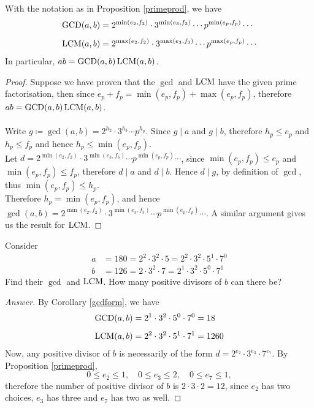 \vspace*{1em}

\begin{lemma}\label{gcdform}
With the notation as in Proposition \ref{primeprod}, we have
\begin{align*}
\operatorname{GCD}(a,b) &= 2^{\min(e_2,f_2)}\cdot 3^{\min(e_3,f_3)}\cdots p^{\min(e_p,f_p)}\cdots\\[0.5em]
\operatorname{LCM}(a,b) &= 2^{\max(e_2,f_2)}\cdot 3^{\max(e_3,f_3)}\cdots p^{\max(e_p,f_p)}\cdots
\end{align*}
In particular, $ab = \operatorname{GCD}(a,b)\operatorname{LCM}(a,b)$.
\end{lemma}
\begin{proof}
Suppose we have proven that the $\gcd$ and $\operatorname{LCM}$ have the given prime factorisation, then since $e_p + f_p = \min(e_p,f_p) + \max(e_p,f_p)$, therefore $ab = \operatorname{GCD}(a,b)\operatorname{LCM}(a,b)$.\\
\\
Write $g \coloneqq \gcd(a,b) = 2^{h_2}\cdot 3^{h_3}\cdots p^{h_p}$. Since $g\mid a$ and $g\mid b$, therefore $h_p \leq e_p$ and $h_p \leq f_p$ and hence $h_p \leq \min(e_p,f_p)$.\\[0.5em]
Let $d = 2^{\min(e_2,f_2)}\cdot 3^{\min(e_3,f_3)}\cdots p^{\min(e_p,f_p)}\cdots$, since $\min(e_p,f_p) \leq e_p$ and $\min(e_p,f_p) \leq f_p$, therefore $d\mid a$ and $d\mid b$. Hence $d\mid g$, by definition of $\gcd$, thus $\min(e_p,f_p) \leq h_p$.\\[0.5em]
Therefore $h_p = \min(e_p,f_p)$, and hence $\gcd(a,b) = 2^{\min(e_2,f_2)}\cdot 3^{\min(e_3,f_3)}\cdots p^{\min(e_p,f_p)}\cdots$. A similar argument gives us the result for $\operatorname{LCM}$.
\end{proof}

\vspace*{1em}

\begin{example}
Consider
\begin{align*}
a &= 180 = 2^2\cdot 3^2\cdot 5 = 2^2\cdot 3^2\cdot 5^1\cdot 7^0\\[0.5em]
b &= 126 = 2\cdot 3^2\cdot 7 = 2^1\cdot 3^2\cdot 5^0\cdot 7^1
\end{align*}
Find their $\gcd$ and $\operatorname{LCM}$. How many positive divisors of $b$ can there be?
\end{example}
\begin{proof}[Answer]
By Corollary \ref{gcdform}, we have
\begin{align*}
\operatorname{GCD}(a,b) &= 2^1\cdot 3^2\cdot 5^0\cdot 7^0 = 18\\[0.5em]
\operatorname{LCM}(a,b) &= 2^2\cdot 3^2\cdot 5^1\cdot 7^1 = 1260
\end{align*}
Now, any positive divisor of $b$ is necessarily of the form $d = 2^{e_2}\cdot 3^{e_3}\cdot 7^{e_7}$. By Proposition \ref{primeprod}, 
\[0 \leq e_2 \leq 1,\quad 0\leq e_3 \leq 2,\quad 0 \leq e_7 \leq 1,\]
therefore the number of positive divisor of $b$ is $2\cdot 3\cdot 2 = 12$, since $e_2$ has two choices, $e_3$ has three and $e_7$ has two as well.
\end{proof}

